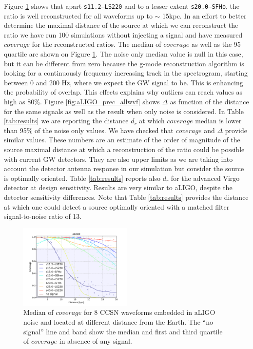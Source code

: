 Figure \ref{fig:aLIGO_cov_allwvf} shows that apart {\tt s11.2--LS220} and to a lesser extent
{\tt s20.0--SFHo}, the ratio is well reconstructed for all waveforms up to $\sim$ 15kpc. In an
effort to better determine the maximal distance of the source at which we can reconstruct the ratio
we have run 100 simulations without injecting a signal and have measured $coverage$ for the
reconstructed ratios.
The median of $coverage$ as well as the 95 quartile are shown on Figure \ref{fig:aLIGO_cov_allwvf}.
The noise only median value is null in this case, but it can be different from zero because
the g-mode reconstruction algorithm is looking for a continuously frequency increasing track
in the spectrogram, starting between 0 and 200 Hz, where we expect the GW signal to be.
This is enhancing the probability of overlap. This effects explains why outliers can reach
values as high as 80\%.
Figure \ref{fig:aLIGO_prec_allwvf} shows $\Delta$ as function of the distance for the same signals
as well as the result when only noise is considered. 
In Table \ref{tab:results} we are reporting the distance $d_r$ at which $coverage$ median is lower
than 95\% of the noise only values. We have checked that $coverage$ and $\Delta$ provide similar
values.
These numbers are an estimate of the order of magnitude of the source maximal distance at which a
reconstruction of the ratio could be possible with current GW detectors.
They are also upper limits as we are taking into account the detector antenna response in our
simulation but consider the source is optimally oriented. 
Table \ref{tab:results} reports also $d_r$ for the advanced Virgo detector at design sensitivity.
Results are very similar to aLIGO, despite the detector sensitivity differences.
Note that Table \ref{tab:results} provides the distance at which one could detect a source
optimally oriented with a matched filter signal-to-noise ratio of 13.

\begin{figure}
  \centering
  \includegraphics[width=0.5\textwidth]{plots/aLIGO_coverage_allwvfs}
 \caption{Median of $coverage$ for 8 CCSN waveforms embedded in aLIGO noise and located at different distance from the Earth. The ``no signal'' line and band show the median and first and third quartile of $coverage$ in absence of any signal.} \label{fig:aLIGO_cov_allwvf}
\end{figure}

